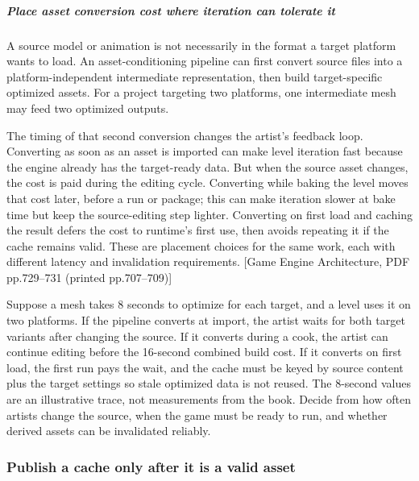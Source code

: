 \subparagraph{Place asset conversion cost where iteration can tolerate it}\label{06-engine-ii-ch032-place-asset-conversion-cost-where-iteration-can-tolerate-it}

\hypertarget{06-engine-ii-ch032-place-asset-conversion-cost-where-iteration-can-tolerate-it}{}

A source model or animation is not necessarily in the format a target platform wants to load. An asset-conditioning pipeline can first convert source files into a platform-independent intermediate representation, then build target-specific optimized assets. For a project targeting two platforms, one intermediate mesh may feed two optimized outputs.

The timing of that second conversion changes the artist's feedback loop. Converting as soon as an asset is imported can make level iteration fast because the engine already has the target-ready data. But when the source asset changes, the cost is paid during the editing cycle. Converting while baking the level moves that cost later, before a run or package; this can make iteration slower at bake time but keep the source-editing step lighter. Converting on first load and caching the result defers the cost to runtime's first use, then avoids repeating it if the cache remains valid. These are placement choices for the same work, each with different latency and invalidation requirements. {[}Game Engine Architecture, PDF pp.729--731 (printed pp.707--709){]}

Suppose a mesh takes 8 seconds to optimize for each target, and a level uses it on two platforms. If the pipeline converts at import, the artist waits for both target variants after changing the source. If it converts during a cook, the artist can continue editing before the 16-second combined build cost. If it converts on first load, the first run pays the wait, and the cache must be keyed by source content plus the target settings so stale optimized data is not reused. The 8-second values are an illustrative trace, not measurements from the book. Decide from how often artists change the source, when the game must be ready to run, and whether derived assets can be invalidated reliably.

\subsubsection{Publish a cache only after it is a valid asset}\label{06-engine-ii-ch032-publish-a-cache-only-after-it-is-a-valid-asset}

